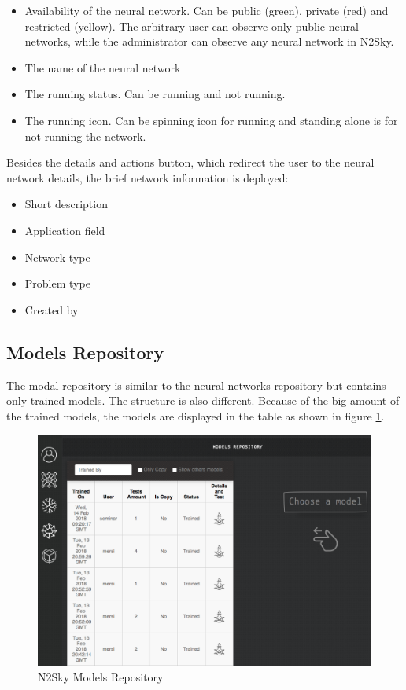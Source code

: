 \begin{enumerate}
\begin{itemize}
\item Availability of the neural network. Can be public (green), private (red) and restricted (yellow). The arbitrary user can observe only public neural networks, while the administrator can observe any neural network in N2Sky.  

\item The name of the neural network
\item The running status. Can be running and not running.
\item The running icon. Can be spinning icon for running and standing alone is for not running the network.
\end{itemize}

Besides the details and actions button, which redirect the user to the neural network details, the brief network information is deployed:
\begin{itemize}
\item Short description
\item Application field
\item Network type
\item Problem type
\item Created by
\end{itemize}

\end{enumerate}

\subsection{Models Repository}\label{Models Repository}

The modal repository is similar to the neural networks repository but contains only trained models. The structure is also different. Because of the big amount of the trained models, the models are displayed in the table as shown in figure \ref{fig:model_repo}. 

\begin{figure}[H]
\begin{center}
  \includegraphics[width=\linewidth]{components/5/img/model_repo.png}
  \caption{N2Sky Models Repository}
  \label{fig:model_repo}
\end{center}
\end{figure}

